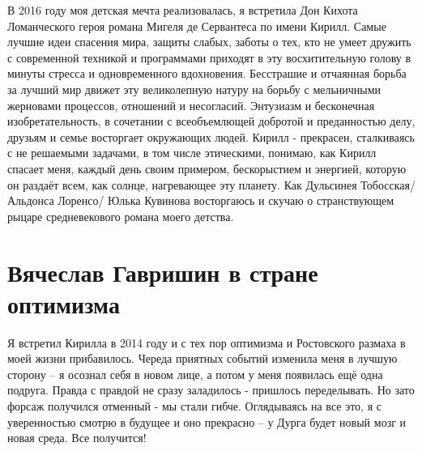 \documentclass[../index.tex]{subfiles}
\begin{document}
	В 2016 году моя детская мечта реализовалась, я встретила Дон Кихота Ломанческого героя романа Мигеля де Сервантеса по имени Кирилл. Самые лучшие идеи спасения мира, защиты слабых, заботы о тех, кто не умеет дружить с современной техникой и программами приходят в эту восхитительную голову в минуты стресса и одновременного вдохновения. Бесстрашие и отчаянная борьба за лучший мир движет эту великолепную натуру на борьбу с мельничными жерновами процессов, отношений и несогласий. Энтузиазм и бесконечная изобретательность, в сочетании с всеобъемлющей добротой и преданностью делу, друзьям и семье восторгает окружающих людей. Кирилл - прекрасен, сталкиваясь с не решаемыми задачами, в том числе этическими, понимаю, как Кирилл спасает меня, каждый день своим примером, бескорыстием и энергией, которую он раздаёт всем, как солнце, нагревающее эту планету. Как Дульсинея Тобосская/ Альдонса Лоренсо/ Юлька Кувинова восторгаюсь и скучаю о странствующем рыцаре средневекового романа моего детства.
	
	
	\section{Вячеслав Гавришин в стране оптимизма}
	
	Я встретил Кирилла в 2014 году и с тех пор оптимизма и Ростовского размаха в моей жизни прибавилось. Череда приятных событий изменила меня в лучшую сторону -- я осознал себя в новом лице, а потом у меня появилась ещё одна подруга. Правда с правдой не сразу заладилось - пришлось переделывать. Но зато форсаж получился отменный - мы стали гибче. Оглядываясь на все это, я с уверенностью смотрю в будущее и оно прекрасно -- у Дурга будет новый мозг и новая среда. Все получится!
	
	
\end{document}
